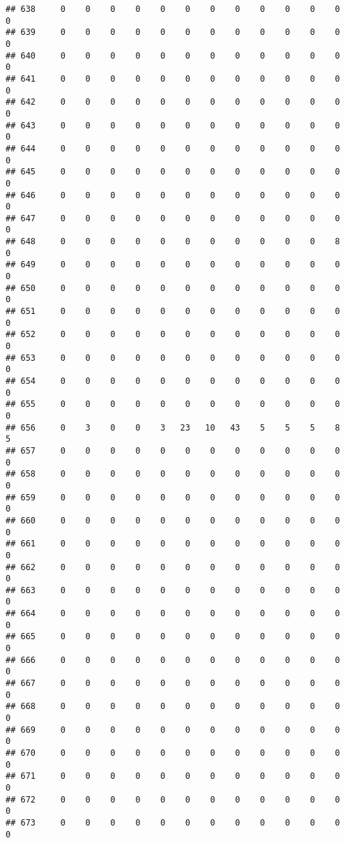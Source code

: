 \documentclass[]{article}
\begin{document}
\begin{verbatim}
## 638     0    0    0    0    0    0    0    0    0    0    0    0    0
## 639     0    0    0    0    0    0    0    0    0    0    0    0    0
## 640     0    0    0    0    0    0    0    0    0    0    0    0    0
## 641     0    0    0    0    0    0    0    0    0    0    0    0    0
## 642     0    0    0    0    0    0    0    0    0    0    0    0    0
## 643     0    0    0    0    0    0    0    0    0    0    0    0    0
## 644     0    0    0    0    0    0    0    0    0    0    0    0    0
## 645     0    0    0    0    0    0    0    0    0    0    0    0    0
## 646     0    0    0    0    0    0    0    0    0    0    0    0    0
## 647     0    0    0    0    0    0    0    0    0    0    0    0    0
## 648     0    0    0    0    0    0    0    0    0    0    0    8    0
## 649     0    0    0    0    0    0    0    0    0    0    0    0    0
## 650     0    0    0    0    0    0    0    0    0    0    0    0    0
## 651     0    0    0    0    0    0    0    0    0    0    0    0    0
## 652     0    0    0    0    0    0    0    0    0    0    0    0    0
## 653     0    0    0    0    0    0    0    0    0    0    0    0    0
## 654     0    0    0    0    0    0    0    0    0    0    0    0    0
## 655     0    0    0    0    0    0    0    0    0    0    0    0    0
## 656     0    3    0    0    3   23   10   43    5    5    5    8    5
## 657     0    0    0    0    0    0    0    0    0    0    0    0    0
## 658     0    0    0    0    0    0    0    0    0    0    0    0    0
## 659     0    0    0    0    0    0    0    0    0    0    0    0    0
## 660     0    0    0    0    0    0    0    0    0    0    0    0    0
## 661     0    0    0    0    0    0    0    0    0    0    0    0    0
## 662     0    0    0    0    0    0    0    0    0    0    0    0    0
## 663     0    0    0    0    0    0    0    0    0    0    0    0    0
## 664     0    0    0    0    0    0    0    0    0    0    0    0    0
## 665     0    0    0    0    0    0    0    0    0    0    0    0    0
## 666     0    0    0    0    0    0    0    0    0    0    0    0    0
## 667     0    0    0    0    0    0    0    0    0    0    0    0    0
## 668     0    0    0    0    0    0    0    0    0    0    0    0    0
## 669     0    0    0    0    0    0    0    0    0    0    0    0    0
## 670     0    0    0    0    0    0    0    0    0    0    0    0    0
## 671     0    0    0    0    0    0    0    0    0    0    0    0    0
## 672     0    0    0    0    0    0    0    0    0    0    0    0    0
## 673     0    0    0    0    0    0    0    0    0    0    0    0    0

\end{verbatim}
\end{document}

